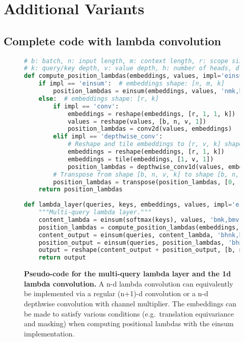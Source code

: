 \documentclass{article} \usepackage{iclr2021_conference,times}
\begin{document}
\section{Additional Variants}

\subsection{Complete code with lambda convolution\label{sec:complete_lambda_layer_code}}
\begin{figure}[h]
\small
\begin{lstlisting}[language=python]
# b: batch, n: input length, m: context length, r: scope size, 
# k: query/key depth, v: value depth, h: number of heads, d: output dimension.
def compute_position_lambdas(embeddings, values, impl='einsum'):
    if impl == 'einsum':  # embeddings shape: [n, m, k]
        position_lambdas = einsum(embeddings, values, 'nmk,bmv->bnkv')
    else:  # embeddings shape: [r, k]
        if impl == 'conv':
            embeddings = reshape(embeddings, [r, 1, 1, k])
            values = reshape(values, [b, n, v, 1])
            position_lambdas = conv2d(values, embeddings) 
        elif impl == 'depthwise_conv':
            # Reshape and tile embeddings to [r, v, k] shape
            embeddings = reshape(embeddings, [r, 1, k])
            embeddings = tile(embeddings, [1, v, 1])
            position_lambdas = depthwise_conv1d(values, embeddings) 
        # Transpose from shape [b, n, v, k] to shape [b, n, k, v]
        position_lambdas = transpose(position_lambdas, [0, 1, 3, 2])
    return position_lambdas
    
def lambda_layer(queries, keys, embeddings, values, impl='einsum'):
    """Multi-query lambda layer."""
    content_lambda = einsum(softmax(keys), values, 'bmk,bmv->bkv')
    position_lambdas = compute_position_lambdas(embeddings, values, impl=impl)
    content_output = einsum(queries, content_lambda, 'bhnk,bkv->bnhv')
    position_output = einsum(queries, position_lambdas, 'bhnk,bnkv->bnhv')
    output = reshape(content_output + position_output, [b, n, d])
    return output
\end{lstlisting}
    \caption{
    \textbf{Pseudo-code for the multi-query lambda layer and the 1d lambda convolution.}
    A n-d lambda convolution can equivalently be implemented via a regular (n+1)-d convolution or a n-d depthwise convolution with channel multiplier.
    The embeddings can be made to satisfy various conditions (e.g.\ translation equivariance and masking) when computing positional lambdas with the einsum implementation.
    }
    \label{fig:complete_lambda_layer_code}
\end{figure}
\end{document}
